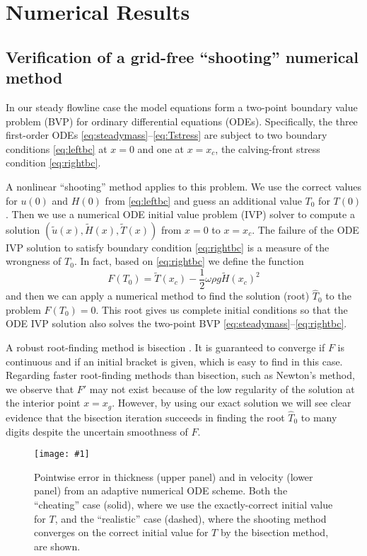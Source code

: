 \documentclass[twocolumn,letterpaper]{igs}
\newcommand{\onecol}[1]{\texttt{[image: \#1]}}
\begin{document}
\section{Numerical Results}

\subsection*{Verification of a grid-free ``shooting'' numerical method}  In our steady flowline case the model equations form a two-point boundary value problem (BVP) for ordinary differential equations (ODEs).  Specifically, the three first-order ODEs \eqref{eq:steadymass}--\eqref{eq:Tstress} are subject to two boundary conditions \eqref{eq:leftbc} at $x=0$ and one at $x=x_c$, the calving-front stress condition \eqref{eq:rightbc}.  

A nonlinear ``shooting'' method \citep[section 17.1]{Pressetal} applies to this problem.  We use the correct values for $u(0)$ and $H(0)$ from \eqref{eq:leftbc} and guess an additional value $T_0$ for $T(0)$.  Then we use a numerical ODE initial value problem (IVP) solver to compute a solution $(\tilde u(x),\tilde H(x),\tilde T(x))$ from $x=0$ to $x=x_c$.  The failure of the ODE IVP solution to satisfy boundary condition \eqref{eq:rightbc} is a measure of the wrongness of $T_0$.  In fact, based on \eqref{eq:rightbc} we define the function
\begin{equation}
F(T_0) = \tilde T(x_c) - \frac{1}{2} \omega \rho g \tilde H(x_c)^2  \label{eq:Fbisection}
\end{equation}
and then we can apply a numerical method to find the solution (root) $\hat T_0$ to the problem $F(T_0)=0$.  This root gives us complete initial conditions so that the ODE IVP solution also solves the two-point BVP \eqref{eq:steadymass}--\eqref{eq:rightbc}.

A robust root-finding method is bisection \citep[section 9.1]{Pressetal}.  It is guaranteed to converge if $F$ is continuous and if an initial bracket is given, which is easy to find in this case.  Regarding faster root-finding methods than bisection, such as Newton's method, we observe that $F'$ may not exist because of the low regularity of the solution at the interior point $x=x_g$. However, by using our exact solution we will see clear evidence that the bisection iteration succeeds in finding the root $\hat T_0$ to many digits despite the uncertain smoothness of $F$.

\begin{figure}[ht]
\onecol{em-error}
\caption{Pointwise error in thickness (upper panel) and in velocity (lower panel) from an adaptive numerical ODE scheme.  Both the ``cheating'' case (solid), where we use the exactly-correct initial value for $T$, and the ``realistic'' case (dashed), where the shooting method converges on the correct initial value for $T$ by the bisection method, are shown.} \label{fig:shoot-error}
\end{figure}
\end{document}
